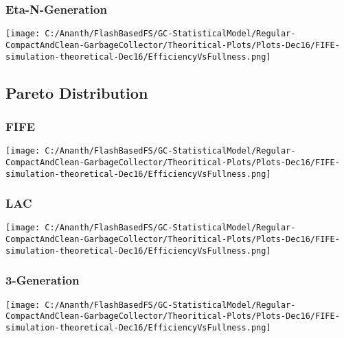 \subsubsection{Eta-N-Generation}
\begin{SCfigure}
	\centering
	\texttt{[image: C:/Ananth/FlashBasedFS/GC-StatisticalModel/Regular-CompactAndClean-GarbageCollector/Theoritical-Plots/Plots-Dec16/FIFE-simulation-theoretical-Dec16/EfficiencyVsFullness.png]}
\end{SCfigure}

\subsection{Pareto Distribution}

\subsubsection{FIFE}
\begin{SCfigure}
	\centering
	\texttt{[image: C:/Ananth/FlashBasedFS/GC-StatisticalModel/Regular-CompactAndClean-GarbageCollector/Theoritical-Plots/Plots-Dec16/FIFE-simulation-theoretical-Dec16/EfficiencyVsFullness.png]}
\end{SCfigure}

\subsubsection{LAC}
\begin{SCfigure}
	\centering
	\texttt{[image: C:/Ananth/FlashBasedFS/GC-StatisticalModel/Regular-CompactAndClean-GarbageCollector/Theoritical-Plots/Plots-Dec16/FIFE-simulation-theoretical-Dec16/EfficiencyVsFullness.png]}
\end{SCfigure}

\subsubsection{3-Generation}
\begin{SCfigure}
	\centering
	\texttt{[image: C:/Ananth/FlashBasedFS/GC-StatisticalModel/Regular-CompactAndClean-GarbageCollector/Theoritical-Plots/Plots-Dec16/FIFE-simulation-theoretical-Dec16/EfficiencyVsFullness.png]}
\end{SCfigure}

